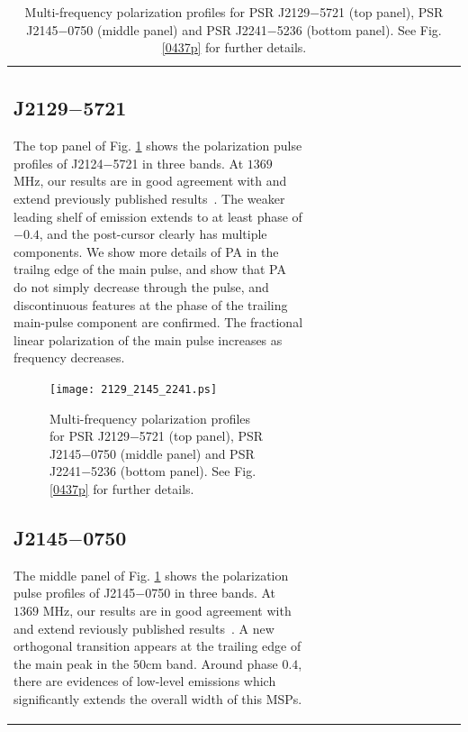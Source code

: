 \documentclass[useAMS,usenatbib]{mn2e}
\begin{document}
\begin{table}
\begin{center}
\begin{tabular}{lcccccccccccc}

\subsection{J2129$-$5721}

The top panel of Fig. \ref{2129p} shows the polarization pulse profiles of 
J2124$-$5721 
in three bands.
%
At $1369$ MHz, our results are in good agreement with and extend previously 
published results~\citep{Yan11}.
%
The weaker leading shelf of emission extends to at least phase of $-0.4$, and 
the post-cursor clearly has multiple components.
%
We show more details of PA in the trailng edge of the main pulse, and show that 
PA do not simply decrease through the pulse, and discontinuous features at the 
phase of the trailing main-pulse component are confirmed.
%
The fractional linear polarization of the main pulse increases as frequency 
decreases.


\begin{figure}
\begin{center}
\texttt{[image: 2129\_2145\_2241.ps]}
\caption{Multi-frequency polarization profiles for PSR J2129$-$5721 (top 
panel), PSR J2145$-$0750 (middle panel) and PSR J2241$-$5236 (bottom panel). 
See Fig. \ref{0437p} for further details.}
\label{2129p}
\end{center}
\end{figure}

\subsection{J2145$-$0750}

The middle panel of Fig. \ref{2129p} shows the polarization pulse profiles of 
J2145$-$0750 
in three bands.
%
At $1369$ MHz, our results are in good agreement with and extend reviously 
published results~\citep{Yan11}.
%
A new orthogonal transition appears at the trailing edge of the main peak in 
the $50$cm band.
%
Around phase $0.4$, there are evidences of low-level emissions which 
significantly extends the overall width of this MSPs.
%


\end{tabular}
\end{center}
\end{table}
\end{document}
